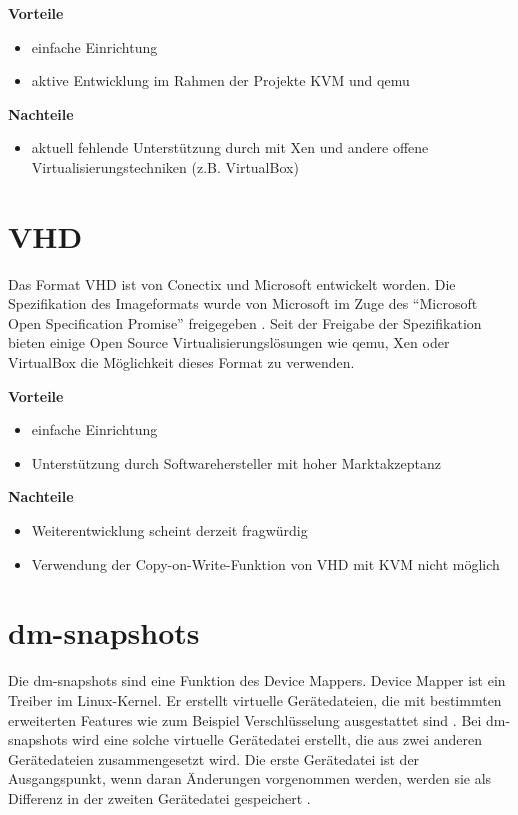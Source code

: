 \textbf{Vorteile}
\begin{itemize}
 \item einfache Einrichtung
 \item aktive Entwicklung im Rahmen der Projekte KVM und qemu
\end{itemize}

\textbf{Nachteile}
\begin{itemize}
 \item aktuell fehlende Unterstützung durch mit Xen und andere offene Virtualisierungstechniken (z.B. VirtualBox)
\end{itemize}

\section{VHD}
Das Format VHD ist von Conectix und Microsoft entwickelt worden. Die Spezifikation des Imageformats wurde von Microsoft im Zuge des ``Microsoft Open Specification Promise'' freigegeben \cite{msosp} \cite{vhdspec}. Seit der Freigabe der Spezifikation bieten einige Open Source Virtualisierungslösungen wie qemu, Xen oder VirtualBox die Möglichkeit dieses Format zu verwenden.   

\textbf{Vorteile}
\begin{itemize}
 \item einfache Einrichtung
 \item Unterstützung durch Softwarehersteller mit hoher Marktakzeptanz
\end{itemize}

\textbf{Nachteile}
\begin{itemize}
 \item Weiterentwicklung scheint derzeit fragwürdig
 \item Verwendung der Copy-on-Write-Funktion von VHD mit KVM nicht möglich
\end{itemize}

\section{dm-snapshots}
Die dm-snapshots sind eine Funktion des Device Mappers. Device Mapper ist ein Treiber im Linux-Kernel. Er erstellt virtuelle Gerätedateien, die mit bestimmten erweiterten Features wie zum Beispiel Verschlüsselung ausgestattet sind \cite{dmmbroz}. Bei dm-snapshots wird eine solche virtuelle Gerätedatei erstellt, die aus zwei anderen Gerätedateien zusammengesetzt wird. Die erste Gerätedatei ist der Ausgangspunkt, wenn daran Änderungen vorgenommen werden, werden sie als Differenz in der zweiten Gerätedatei gespeichert \cite{dmkerneldoc}. 

